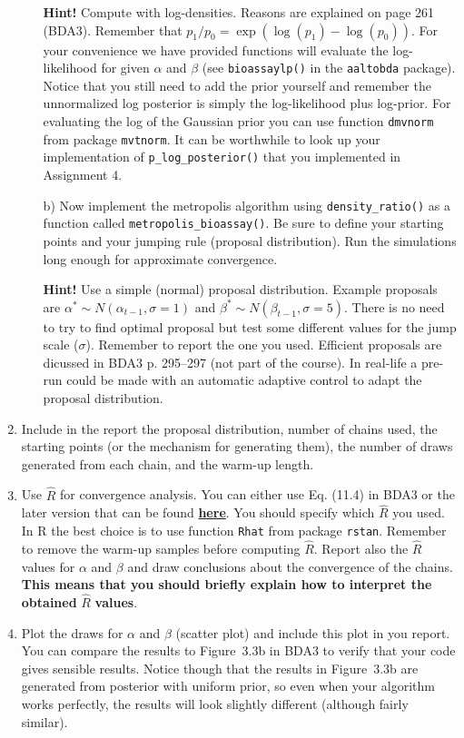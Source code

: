 \documentclass[a4paper,11pt]{article}
\begin{document}
\begin{enumerate}
\begin{itemize}
\textbf{Hint!} Compute with log-densities. Reasons are explained on page 261 (BDA3). Remember that $p_1/p_0=\exp(\log(p_1)-\log(p_0))$. For your convenience we have provided functions will evaluate the log-likelihood for given $\alpha$ and $\beta$ (see {\tt bioassaylp()} in the {\tt aaltobda} package). Notice that you still need to add the prior yourself and remember the unnormalized log posterior is simply the log-likelihood plus log-prior. For evaluating the log of the Gaussian prior you can use function {\tt dmvnorm} from package {\tt mvtnorm}. It can be worthwhile to look up your implementation of {\tt p\_log\_posterior()} that you implemented in Assignment 4.
\item[b)] Now implement the metropolis algorithm using {\tt density\_ratio()} as a function called {\tt metropolis\_bioassay()}. Be sure to define your starting points and your jumping rule (proposal distribution). Run the simulations long enough for approximate convergence. 

\textbf{Hint!} Use a simple (normal) proposal distribution. Example proposals are $\alpha^* \sim N(\alpha_{t-1}, \sigma = 1)$ and $\beta^* \sim N(\beta_{t-1}, \sigma = 5)$. There is no need to try to find optimal proposal but test some different values for the jump scale ($\sigma$). Remember to report the one you used. Efficient proposals are dicussed in BDA3 p. 295--297 (not part of the course). In real-life a pre-run could be made with an automatic adaptive control to adapt the proposal distribution.
\end{itemize}

\item Include in the report the proposal distribution, number of chains used, the starting points (or the mechanism for generating them), the number of draws generated from each chain, and the warm-up length. 

\item Use $\hat{R}$ for convergence analysis. You can either use Eq. (11.4) in BDA3 or the later version that can be found \href{https://arxiv.org/abs/1903.08008}{\textbf{here}}. You should specify which $\hat{R}$ you used. In R the best choice is to use function {\tt Rhat} from package {\tt rstan}. Remember to remove the warm-up samples before computing $\hat R$. Report also the $\hat R$ values for $\alpha$ and $\beta$ and draw conclusions about the convergence of the chains.
\textbf{This means that you should briefly explain how to interpret the obtained} $\hat R$ \textbf{values}.

\item Plot the draws for $\alpha$ and $\beta$ (scatter plot) and include this plot in you report. You can compare the results to Figure~3.3b in BDA3 to verify that your code gives sensible results. Notice though that the results in Figure~3.3b are generated from posterior with uniform prior, so even when your algorithm works perfectly, the results will look slightly different (although fairly similar).

\end{enumerate}
\end{document}

